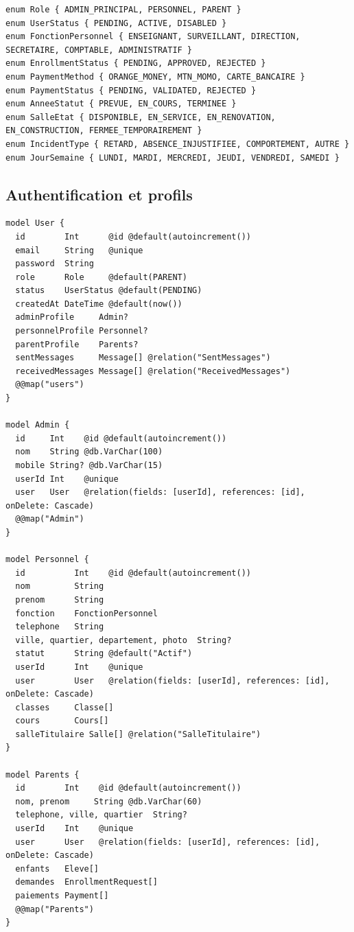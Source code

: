 \documentclass[12pt,a4paper]{article}
\begin{document}
\begin{lstlisting}[style=code]
enum Role { ADMIN_PRINCIPAL, PERSONNEL, PARENT }
enum UserStatus { PENDING, ACTIVE, DISABLED }
enum FonctionPersonnel { ENSEIGNANT, SURVEILLANT, DIRECTION, SECRETAIRE, COMPTABLE, ADMINISTRATIF }
enum EnrollmentStatus { PENDING, APPROVED, REJECTED }
enum PaymentMethod { ORANGE_MONEY, MTN_MOMO, CARTE_BANCAIRE }
enum PaymentStatus { PENDING, VALIDATED, REJECTED }
enum AnneeStatut { PREVUE, EN_COURS, TERMINEE }
enum SalleEtat { DISPONIBLE, EN_SERVICE, EN_RENOVATION, EN_CONSTRUCTION, FERMEE_TEMPORAIREMENT }
enum IncidentType { RETARD, ABSENCE_INJUSTIFIEE, COMPORTEMENT, AUTRE }
enum JourSemaine { LUNDI, MARDI, MERCREDI, JEUDI, VENDREDI, SAMEDI }
\end{lstlisting}

\subsection{Authentification et profils}

\begin{lstlisting}[style=code]
model User {
  id        Int      @id @default(autoincrement())
  email     String   @unique
  password  String
  role      Role     @default(PARENT)
  status    UserStatus @default(PENDING)
  createdAt DateTime @default(now())
  adminProfile     Admin?
  personnelProfile Personnel?
  parentProfile    Parents?
  sentMessages     Message[] @relation("SentMessages")
  receivedMessages Message[] @relation("ReceivedMessages")
  @@map("users")
}

model Admin {
  id     Int    @id @default(autoincrement())
  nom    String @db.VarChar(100)
  mobile String? @db.VarChar(15)
  userId Int    @unique
  user   User   @relation(fields: [userId], references: [id], onDelete: Cascade)
  @@map("Admin")
}

model Personnel {
  id          Int    @id @default(autoincrement())
  nom         String
  prenom      String
  fonction    FonctionPersonnel
  telephone   String
  ville, quartier, departement, photo  String?
  statut      String @default("Actif")
  userId      Int    @unique
  user        User   @relation(fields: [userId], references: [id], onDelete: Cascade)
  classes     Classe[]
  cours       Cours[]
  salleTitulaire Salle[] @relation("SalleTitulaire")
}

model Parents {
  id        Int    @id @default(autoincrement())
  nom, prenom     String @db.VarChar(60)
  telephone, ville, quartier  String?
  userId    Int    @unique
  user      User   @relation(fields: [userId], references: [id], onDelete: Cascade)
  enfants   Eleve[]
  demandes  EnrollmentRequest[]
  paiements Payment[]
  @@map("Parents")
}
\end{lstlisting}
\end{document}
